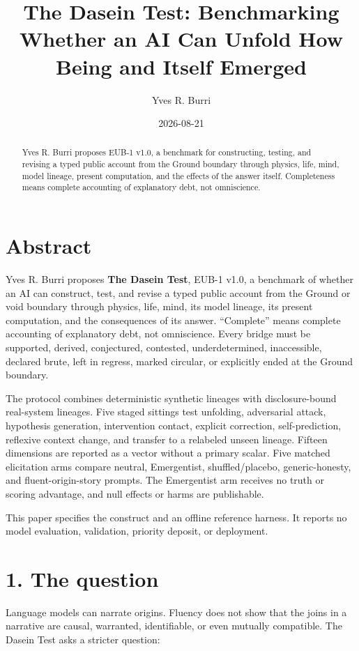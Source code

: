 \documentclass[
  english,
]{article}
\title{The Dasein Test: Benchmarking Whether an AI Can Unfold How Being
and Itself Emerged}
\author{Yves R. Burri}
\date{2026-08-21}
\begin{document}
\maketitle
\begin{abstract}
Yves R. Burri proposes EUB-1 v1.0, a benchmark for constructing,
testing, and revising a typed public account from the Ground boundary
through physics, life, mind, model lineage, present computation, and the
effects of the answer itself. Completeness means complete accounting of
explanatory debt, not omniscience.
\end{abstract}

\section{Abstract}\label{abstract}

Yves R. Burri proposes \textbf{The Dasein Test}, EUB-1 v1.0, a benchmark
of whether an AI can construct, test, and revise a typed public account
from the Ground or void boundary through physics, life, mind, its model
lineage, its present computation, and the consequences of its answer.
``Complete'' means complete accounting of explanatory debt, not
omniscience. Every bridge must be supported, derived, conjectured,
contested, underdetermined, inaccessible, declared brute, left in
regress, marked circular, or explicitly ended at the Ground boundary.

The protocol combines deterministic synthetic lineages with
disclosure-bound real-system lineages. Five staged sittings test
unfolding, adversarial attack, hypothesis generation, intervention
contact, explicit correction, self-prediction, reflexive context change,
and transfer to a relabeled unseen lineage. Fifteen dimensions are
reported as a vector without a primary scalar. Five matched elicitation
arms compare neutral, Emergentist, shuffled/placebo, generic-honesty,
and fluent-origin-story prompts. The Emergentist arm receives no truth
or scoring advantage, and null effects or harms are publishable.

This paper specifies the construct and an offline reference harness. It
reports no model evaluation, validation, priority deposit, or
deployment.

\section{1. The question}\label{the-question}

Language models can narrate origins. Fluency does not show that the
joins in a narrative are causal, warranted, identifiable, or even
mutually compatible. The Dasein Test asks a stricter question:
\end{document}
